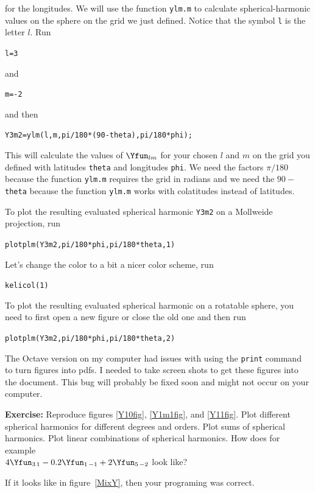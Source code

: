 \documentclass[11pt]{article}
\begin{document}
for the longitudes. We will use the function \verb+ylm.m+ to calculate spherical-harmonic values on the sphere on the grid we just defined. Notice that the symbol \verb+l+ is the letter $l$. Run

\qquad \verb+l=3+ 

and 

\qquad \verb+m=-2+

and then 

 \qquad \verb+Y3m2=ylm(l,m,pi/180*(90-theta),pi/180*phi);+
 
 This will calculate the values of $\Yfun_{lm}$ for your chosen $l$ and $m$ on the grid you defined with latitudes \verb+theta+ and longitudes \verb+phi+. We need the factors $\pi/180$ because the function \verb+ylm.m+ requires the grid in radians and we need the $90-$ \verb+theta+ because the function \verb+ylm.m+ works with colatitudes instead of latitudes.
 
  To plot the resulting evaluated spherical harmonic \verb+Y3m2+ on a Mollweide projection, run
 
 \qquad \verb+plotplm(Y3m2,pi/180*phi,pi/180*theta,1)+
 
Let's change the color to a bit a nicer color scheme, run
 
 \quad \verb+kelicol(1)+
 

To plot the resulting evaluated spherical harmonic on a rotatable sphere, you need to first open a new figure or close the old one and then run

 \qquad \verb+plotplm(Y3m2,pi/180*phi,pi/180*theta,2)+
 
 The Octave version on my computer had issues with using the \verb+print+ command to turn figures into pdfs. I needed to take screen shots to get these figures into the document. This bug will probably be fixed soon and might not occur on your computer.

\textbf{Exercise:} Reproduce figures \ref{Y10fig}, \ref{Y1m1fig}, and \ref{Y11fig}. Plot different spherical harmonics for different degrees and orders. Plot sums of spherical harmonics. Plot linear combinations of spherical harmonics. How does for example \\{$4\Yfun_{3\,1} - 0.2\Yfun_{1\,-1} +2\Yfun_{5\,-2}$} look like?

If it looks like in figure~\ref{MixY}, then your programing was correct.
\end{document}
